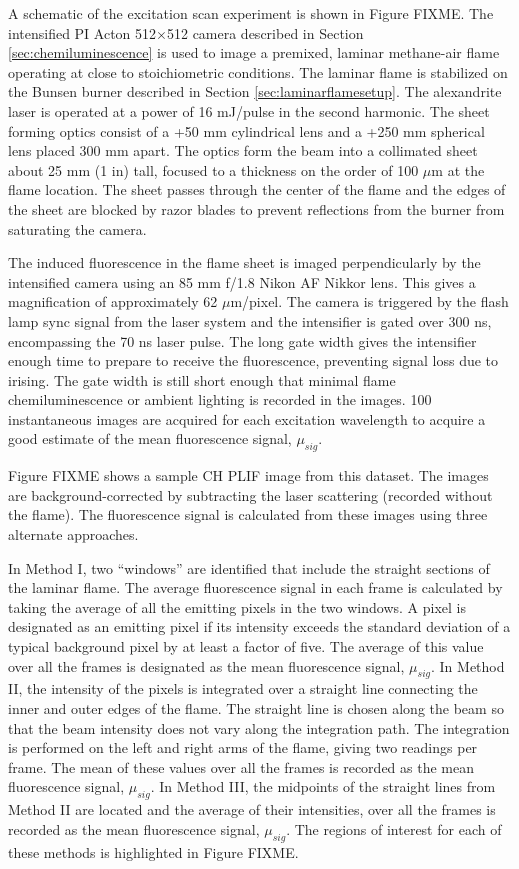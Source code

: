 A schematic of the excitation scan experiment is shown in Figure FIXME.
The intensified PI Acton 512\(\times\)512 camera described in Section \ref{sec:chemiluminescence} is used to image a premixed, laminar methane-air flame operating at close to stoichiometric conditions.
The laminar flame is stabilized on the Bunsen burner described in Section \ref{sec:laminarflamesetup}.
The alexandrite laser is operated at a power of 16 mJ/pulse in the second harmonic.
The sheet forming optics consist of a +50 mm cylindrical lens and a +250 mm spherical lens placed 300 mm apart.
The optics form the beam into a collimated sheet about 25 mm (1 in) tall, focused to a thickness on the order of 100 \(\mu\)m at the flame location.
The sheet passes through the center of the flame and the edges of the sheet are blocked by razor blades to prevent reflections from the burner from saturating the camera.

The induced fluorescence in the flame sheet is imaged perpendicularly by the intensified camera using an 85 mm f/1.8 Nikon AF Nikkor lens.
This gives a magnification of approximately 62 \(\mu\)m/pixel.
The camera is triggered by the flash lamp sync signal from the laser system and the intensifier is gated over 300 ns, encompassing the 70 ns laser pulse.
The long gate width gives the intensifier enough time to prepare to receive the fluorescence, preventing signal loss due to irising.
The gate width is still short enough that minimal flame chemiluminescence or ambient lighting is recorded in the images.
100 instantaneous images are acquired for each excitation wavelength to acquire a good estimate of the mean fluorescence signal, \(\mu_{sig}\).

Figure FIXME shows a sample CH PLIF image from this dataset.
The images are background-corrected by subtracting the laser scattering (recorded without the flame).
The fluorescence signal is calculated from these images using three alternate approaches.

In Method I, two ``windows'' are identified that include the straight sections of the laminar flame.
The average fluorescence signal in each frame is calculated by taking the average of all the emitting pixels in the two windows.
A pixel is designated as an emitting pixel if its intensity exceeds the standard deviation of a typical background pixel by at least a factor of five.
The average of this value over all the frames is designated as the mean fluorescence signal, \(\mu_{sig}\).
In Method II, the intensity of the pixels is integrated over a straight line connecting the inner and outer edges of the flame.
The straight line is chosen along the beam so that the beam intensity does not vary along the integration path.
The integration is performed on the left and right arms of the flame, giving two readings per frame.
The mean of these values over all the frames is recorded as the mean fluorescence signal, \(\mu_{sig}\).
In Method III, the midpoints of the straight lines from Method II are located and the average of their intensities, over all the frames is recorded as the mean fluorescence signal, \(\mu_{sig}\).
The regions of interest for each of these methods is highlighted in Figure FIXME.

